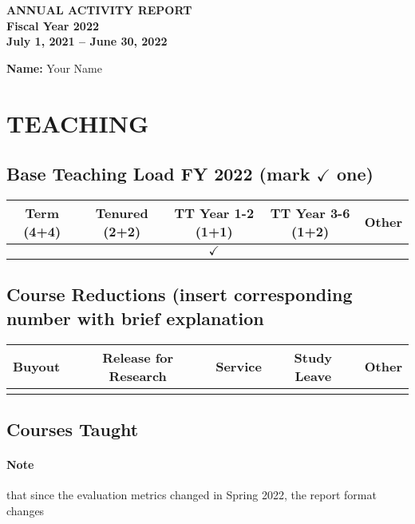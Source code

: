 \documentclass[11pt]{article}
\newcommand{\fy}{2022}
\newcommand{\fyperiod}{July 1, 2021 -- June 30, 2022}
\newcommand{\myname}{Your Name}
\begin{document}
\newpage
\begin{center}
  \textbf{ANNUAL ACTIVITY REPORT\\
    Fiscal Year \fy{}\\
    \fyperiod}
\end{center}

\textbf{Name:} \myname{}

\section{TEACHING}
\subsection{Base Teaching Load FY \fy{} (mark $\checkmark$ one)}

\begin{center}
\begin{tabular}{ccccc}
    \toprule
    \textbf{Term (4+4)}& \textbf{Tenured (2+2)}& \textbf{TT Year 1-2 (1+1)}& \textbf{TT Year 3-6 (1+2)}&\textbf{Other}\\
      \midrule
                       & & $\checkmark$ && \\
      \bottomrule
  \end{tabular}
\end{center}

\subsection{Course Reductions (insert corresponding number with brief explanation}
\begin{center}
  \begin{tabular}{ccccc}
    \toprule
    \textbf{Buyout}&\textbf{Release for Research}&\textbf{Service}&\textbf{Study Leave}&\textbf{Other}\\
    \midrule
    & & & & \\
    \bottomrule
  \end{tabular}
\end{center}


\subsection{Courses Taught}
\paragraph{Note} that since the evaluation metrics changed in Spring 2022, the report format changes
\end{document}
